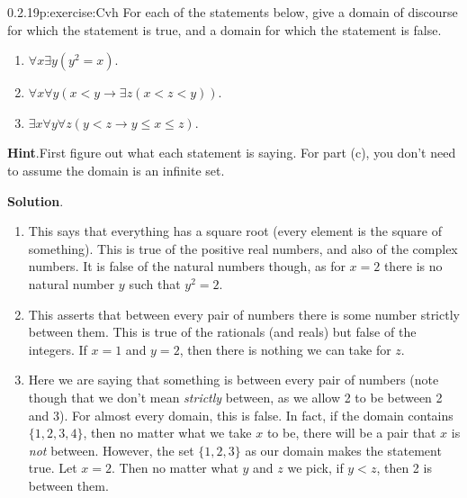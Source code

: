 \documentclass[twoside,11pt,]{book}
\newcommand{\blocktitlefont}{\relax}
\numberwithin{equation}{chapter}
\newcommand{\imp}{\rightarrow}
\newcommand{\lt}{<}
\begin{document}
\begin{divisionsolution}{0.2.19}{}{p:exercise:Cvh}%
For each of the statements below, give a domain of discourse for which the statement is true, and a domain for which the statement is false.%
\begin{enumerate}[label=(\alph*)]
\item{}\(\forall x \exists y (y^2 = x)\).%
\item{}\(\forall x \forall y (x \lt y \imp \exists z (x \lt z \lt y))\).%
\item{}\(\exists x \forall y \forall z (y \lt z \imp y \le x \le z)\).%
\end{enumerate}
%
\par\smallskip%
\noindent\textbf{\blocktitlefont Hint}.\quad{}First figure out what each statement is saying.  For part (c), you don't need to assume the domain is an infinite set.%
\par\smallskip%
\noindent\textbf{\blocktitlefont Solution}.\quad{}%
\begin{enumerate}[label=(\alph*)]
\item{}This says that everything has a square root (every element is the square of something). This is true of the positive real numbers, and also of the complex numbers. It is false of the natural numbers though, as for \(x = 2\) there is no natural number \(y\) such that \(y^2 = 2\).%
\item{}This asserts that between every pair of numbers there is some number strictly between them. This is true of the rationals (and reals) but false of the integers. If \(x = 1\) and \(y = 2\), then there is nothing we can take for \(z\).%
\item{}Here we are saying that something is between every pair of numbers (note though that we don't mean \emph{strictly} between, as we allow 2 to be between 2 and 3). For almost every domain, this is false. In fact, if the domain contains \(\{1,2,3, 4\}\), then no matter what we take \(x\) to be, there will be a pair that \(x\) is \emph{not} between. However, the set \(\{1,2,3\}\) as our domain makes the statement true. Let \(x = 2\). Then no matter what \(y\) and \(z\) we pick, if \(y \lt z\), then 2 is between them.%
\end{enumerate}
%
\end{divisionsolution}%
\end{document}
